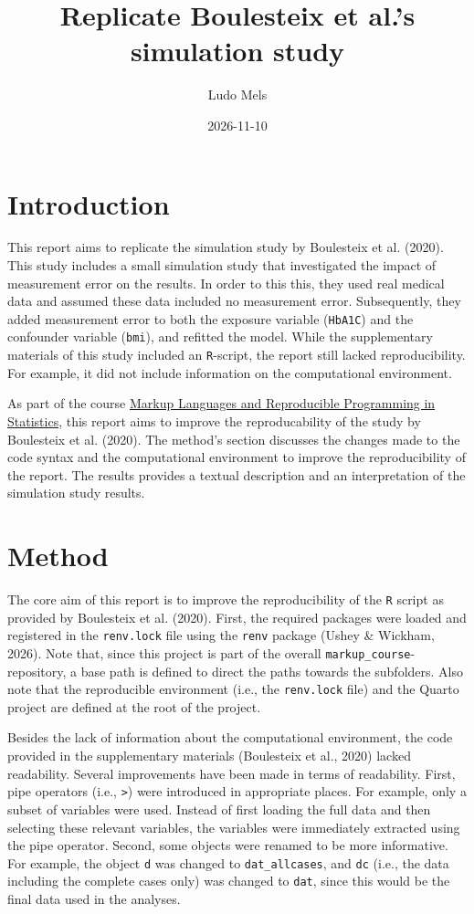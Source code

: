 \documentclass[
  letterpaper,
  DIV=11,
  numbers=noendperiod]{scrartcl}
\title{Replicate Boulesteix et al.'s simulation study}
\author{Ludo Mels}
\date{2026-11-10}
\begin{document}
\maketitle


\section{Introduction}\label{introduction}

This report aims to replicate the simulation study by Boulesteix et al.
(2020). This study includes a small simulation study that investigated
the impact of measurement error on the results. In order to this this,
they used real medical data and assumed these data included no
measurement error. Subsequently, they added measurement error to both
the exposure variable (\texttt{HbA1C}) and the confounder variable
(\texttt{bmi}), and refitted the model. While the supplementary
materials of this study included an \texttt{R}-script, the report still
lacked reproducibility. For example, it did not include information on
the computational environment.

As part of the course \href{https://mlarpis.github.io/markup/}{Markup
Languages and Reproducible Programming in Statistics}, this report aims
to improve the reproducability of the study by Boulesteix et al. (2020).
The method's section discusses the changes made to the code syntax and
the computational environment to improve the reproducibility of the
report. The results provides a textual description and an interpretation
of the simulation study results.

\section{Method}\label{method}

The core aim of this report is to improve the reproducibility of the
\texttt{R} script as provided by Boulesteix et al. (2020). First, the
required packages were loaded and registered in the \texttt{renv.lock}
file using the \texttt{renv} package (Ushey \& Wickham, 2026). Note
that, since this project is part of the overall
\texttt{markup\_course}-repository, a base path is defined to direct the
paths towards the subfolders. Also note that the reproducible
environment (i.e., the \texttt{renv.lock} file) and the Quarto project
are defined at the root of the project.

Besides the lack of information about the computational environment, the
code provided in the supplementary materials (Boulesteix et al., 2020)
lacked readability. Several improvements have been made in terms of
readability. First, pipe operators (i.e.,
\texttt{\textbar{}\textgreater{}}) were introduced in appropriate
places. For example, only a subset of variables were used. Instead of
first loading the full data and then selecting these relevant variables,
the variables were immediately extracted using the pipe operator.
Second, some objects were renamed to be more informative. For example,
the object \texttt{d} was changed to \texttt{dat\_allcases}, and
\texttt{dc} (i.e., the data including the complete cases only) was
changed to \texttt{dat}, since this would be the final data used in the
analyses.
\end{document}
